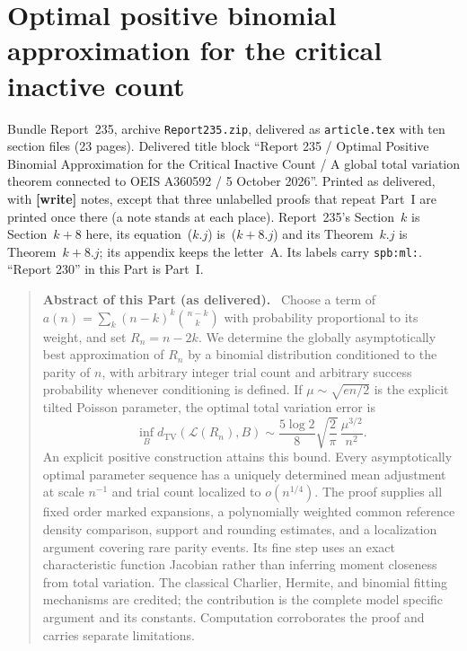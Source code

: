 \documentclass[11pt,letterpaper]{article}
\numberwithin{equation}{section}
\theoremstyle{definition}\newtheorem{definition}[theorem]{Definition}
\theoremstyle{remark}\newtheorem{remark}[theorem]{Remark}
\newcommand{\TV}{d_{\mathrm{TV}}}
\newcommand{\1}{\mathbf 1}
\newcommand{\Law}{\mathcal L}
\newcommand{\file}[1]{\nolinkurl{#1}}
\newenvironment{partabstract}{\begin{quote}\small\noindent\textbf{Abstract of this Part (as delivered).}\ }{\end{quote}}
\newcommand{\partsource}[1]{\par\noindent\begin{minipage}{\textwidth}\small #1\end{minipage}\par\medskip}
\begin{document}
\part{Optimal positive binomial approximation for the critical inactive count}\label{spb:ml:part}
\partsource{Bundle Report~235, archive \file{Report235.zip}, delivered as \file{article.tex} with ten section files (23 pages). Delivered title block ``Report 235 / Optimal Positive Binomial Approximation for the Critical Inactive Count / A global total variation theorem connected to OEIS A360592 / 5 October 2026''. Printed as delivered, with \textbf{[write]} notes, except that three unlabelled proofs that repeat Part~I are printed once there (a note stands at each place). Report~235's Section~$k$ is Section~$k+8$ here, its equation~($k.j$) is~($k+8.j$) and its Theorem~$k.j$ is Theorem~$k+8.j$; its appendix keeps the letter~A. Its labels carry \file{spb:ml:}. ``Report 230'' in this Part is Part~I.}
\begin{partabstract}
Choose a term of $a(n)=\sum_k(n-k)^k\binom{n-k}{k}$ with probability proportional to its weight, and set $R_n=n-2k$. We determine the globally asymptotically best approximation of $R_n$ by a binomial distribution conditioned to the parity of $n$, with arbitrary integer trial count and arbitrary success probability whenever conditioning is defined. If $\mu\sim\sqrt{en/2}$ is the explicit tilted Poisson parameter, the optimal total variation error is
\[
\inf_B\TV(\Law(R_n),B)\sim
\frac{5\log2}{8}\sqrt{\frac2\pi}\,\frac{\mu^{3/2}}{n^2}.
\]
An explicit positive construction attains this bound. Every asymptotically optimal parameter sequence has a uniquely determined mean adjustment at scale $n^{-1}$ and trial count localized to $o(n^{1/4})$. The proof supplies all fixed order marked expansions, a polynomially weighted common reference density comparison, support and rounding estimates, and a localization argument covering rare parity events. Its fine step uses an exact characteristic function Jacobian rather than inferring moment closeness from total variation. The classical Charlier, Hermite, and binomial fitting mechanisms are credited; the contribution is the complete model specific argument and its constants. Computation corroborates the proof and carries separate limitations.

\end{partabstract}
\setcounter{section}{8}
\end{document}
